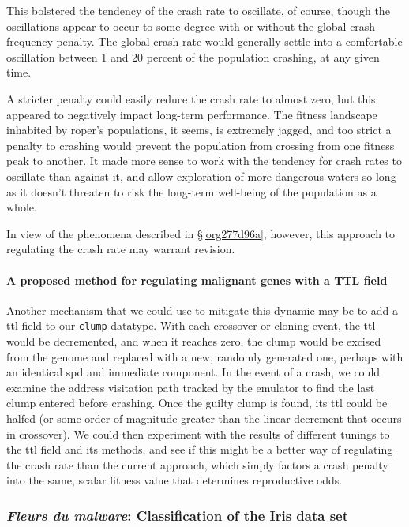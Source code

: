 \documentclass[12pt,glossary]{dalthesis}
\begin{document}
This bolstered the tendency of the crash rate to oscillate, of course, though
the oscillations appear to occur to some degree with or without the global
crash frequency penalty. The global crash rate would generally settle into
a comfortable oscillation between 1 and 20 percent of the population crashing,
at any given time. 

A stricter penalty could easily reduce the crash rate to almost zero, but
this appeared to negatively impact long-term performance. The fitness landscape
inhabited by \gls{roper}'s populations, it seems, is extremely jagged, and
too strict a penalty to crashing would prevent the population from crossing 
from one fitness peak to another. It made more sense to work with the tendency
for crash rates to oscillate than against it, and allow exploration of more
dangerous waters so long as it doesn't threaten to risk the long-term well-being
of the population as a whole. 

In view of the phenomena described in \S \ref{org277d96a}, however, this approach to regulating the crash rate may warrant revision. 

\paragraph{A proposed method for regulating malignant genes with a TTL field}
\label{sec:orgaaa79ea}
\label{org4c68fa8}

Another mechanism that we could use to mitigate this dynamic may be to add
a \gls{ttl} field to our \texttt{clump} datatype. With each crossover or cloning event, 
the \gls{ttl} would be decremented, and when it reaches zero, the clump would be
excised from the genome and replaced with a new, randomly generated one, perhaps
with an identical \gls{spd} and immediate component. In the event of a crash, we
could examine the address visitation path tracked by the emulator to find the 
last clump entered before crashing. Once the guilty clump is found, its \gls{ttl}
could be halfed (or some order of magnitude greater than the linear decrement
that occurs in crossover). We could then experiment with the results of different
tunings to the \gls{ttl} field and its methods, and see if this might be a better
way of regulating the crash rate than the current approach, which simply factors
a crash penalty into the same, scalar fitness value that determines reproductive
odds. 


\subsubsection{\emph{Fleurs du malware}: Classification of the Iris data set}
\label{sec:orgec0fa64}
\label{org198cab5}
\end{document}
